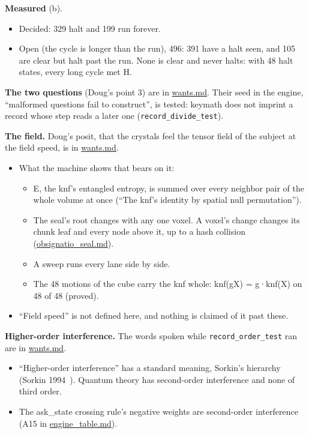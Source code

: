 \textbf{Measured} (b).

\begin{itemize}
\item Decided: 329 halt and 199 run forever.
\item Open (the cycle is longer than the run), 496: 391 have a halt seen, and 105 are clear but halt past the run. None is clear and never halts: with 48 halt states, every long cycle met H.
\end{itemize}

\textbf{The two questions} (Doug's point 3) are in \hyperref[chap:wants]{wants.md}. Their seed in the engine, “malformed questions fail to construct”, is tested: keymath does not imprint a record whose step reads a later one (\texttt{record\_\allowbreak{}divide\_\allowbreak{}test}).

\textbf{The field.} Doug's posit, that the crystals feel the tensor field of the subject at the field speed, is in \hyperref[chap:wants]{wants.md}.

\begin{itemize}
\item What the machine shows that bears on it:

\begin{itemize}
\item E, the knf's entangled entropy, is summed over every neighbor pair of the whole volume at once (“The knf's identity by spatial null permutation”).
\item The seal's root changes with any one voxel. A voxel's change changes its chunk leaf and every node above it, up to a hash collision (\hyperref[chap:obsignatio-seal]{obsignatio\_\allowbreak{}seal.md}).
\item A sweep runs every lane side by side.
\item The 48 motions of the cube carry the knf whole: knf(gX) = g·knf(X) on 48 of 48 (proved).
\end{itemize}
\item “Field speed” is not defined here, and nothing is claimed of it past these.
\end{itemize}

\textbf{Higher-order interference.} The words spoken while \texttt{record\_\allowbreak{}order\_\allowbreak{}test} ran are in \hyperref[chap:wants]{wants.md}.

\begin{itemize}
\item “Higher-order interference” has a standard meaning, Sorkin's hierarchy (Sorkin 1994~\cite{src:Sorkin-1994}). Quantum theory has second-order interference and none of third order.
\item The ask\_\allowbreak{}state crossing rule's negative weights are second-order interference (A15 in \hyperref[chap:engine-table]{engine\_\allowbreak{}table.md}).
\end{itemize}

